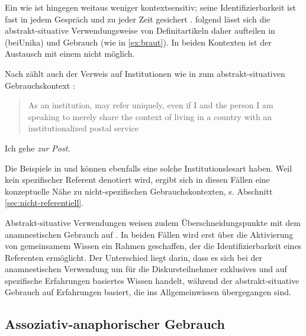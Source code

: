 Ein  wie  ist hingegen weitaus weniger kontextsensitiv; seine Identifizierbarkeit ist fast in jedem Gespräch und zu jeder Zeit gesichert \parencite[549]{Schroeder2006}. \textcite[40--41]{Studler2011} folgend lässt sich die abstrakt-situative  Verwendungsweise von Definitartikeln  daher aufteilen in  (bei\linebreak Unika)  und  Gebrauch (wie in \ref{ex:braut}). In beiden Kontexten ist der Austausch mit einem  nicht möglich. 

Nach \citeauthor{Schroeder2006} zählt auch der Verweis auf Institutionen wie in  zum abstrakt-situativen  Gebrauchskontext \parencite[vgl. auch][110]{Nubling2005}:  \blockcquote[549]{Schroeder2006}{As an institution,  may refer uniquely, even if I and the person I am speaking to merely share the context of living in a country with an institutionalized postal service}. 

\begin{exe}
	\ex \label{ex:post} Ich gehe \textit{zur Post}.
\end{exe}

\noindent
Die Beispiele in  und  können ebenfalls eine solche Institutionslesart haben. Weil kein spezifischer Referent denotiert wird, ergibt sich in diesen Fällen eine konzeptuelle Nähe zu nicht-spezifischen 
 Gebrauchskontexten, s. Abschnitt \ref{sec:nicht-referentiell}.

Abstrakt-situative  Verwendungen weisen zudem Überschneidungspunkte mit dem anamnestischen  Gebrauch auf \parencite[62]{Himmelmann1997}. In beiden Fällen wird erst über die Aktivierung von gemeinsamem Wissen ein Rahmen geschaffen, der die Identifizierbarkeit eines Referenten ermöglicht. Der Unterschied liegt darin, dass es sich bei der anamnestischen  Verwendung um für die Diskursteilnehmer exklusives und auf spezifische Erfahrungen basiertes Wissen handelt, während der abstrakt-situative  Gebrauch auf Erfahrungen basiert, die ins Allgemeinwissen übergegangen sind. 

\subsection{Assoziativ-anaphorischer Gebrauch}\label{sec:asso}

